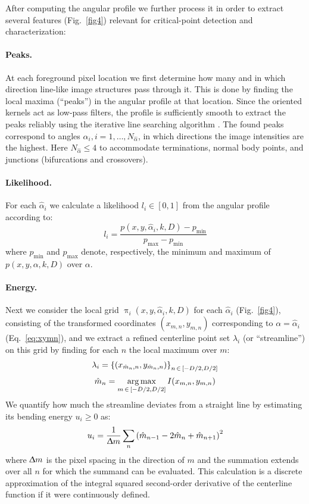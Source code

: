 After computing the angular profile we further process it in order to extract several features (Fig.~\ref{fig4}) relevant for critical-point detection and characterization:

\paragraph{Peaks.} At each foreground pixel location we first determine how many and in which direction line-like image structures pass through it. This is done by finding the local maxima (``peaks'') in the angular profile at that location. Since the oriented kernels act as low-pass filters, the profile is sufficiently smooth to extract the peaks reliably using the iterative line searching algorithm \cite{flannery1992numerical}. The found peaks correspond to angles $\hat{\alpha}_{i}, i=1,\dots,N_{\hat{\alpha}}$, in which directions the image intensities are the highest. Here $N_{\hat{\alpha}}\leq 4$ to accommodate terminations, normal body points, and junctions (bifurcations and crossovers).

\paragraph{Likelihood.} For each $\hat{\alpha}_{i}$ we calculate a likelihood $l_i \in \left[ 0, 1 \right]  $ from the angular profile according to:
\begin{equation} 
l_i = \frac{p(x,y,\hat{\alpha}_{i},k,D)-p_{\min}}{p_{\max}-p_{\min}}
\end{equation}
where $p_{\min}$ and $p_{\max}$ denote, respectively, the minimum and maximum of $p(x,y,\alpha,k,D)$ over $\alpha$.

\paragraph{Energy.} Next we consider the local grid $\uppi_{i}(x,y,\hat{\alpha}_{i},k,D)$ for each $\hat{\alpha}_{i}$ (Fig.~\ref{fig4}), consisting of the transformed coordinates $(x_{m,n},y_{m,n})$ corresponding to $\alpha=\hat{\alpha}_{i}$ (Eq.~\ref{eq:xymn}), and we extract a refined centerline point set $\lambda_{i}$ (or ``streamline'') on this grid by finding for each $n$ the local maximum over $m$:
\begin{gather}
\label{eq:refine-centerline} 
\lambda_{i} = \left\{(x_{\hat{m}_{n},n},y_{\hat{m}_{n},n})\right\}_{n\,\in\,\left[-D/2,D/2\right]}\\[0.5ex]
\hat{m}_{n} = \operatorname*{arg\,max}_{m\,\in\,\left[-D/2,D/2\right]} I(x_{m,n},y_{m,n})
\label{eq:hatm}
\end{gather}
We quantify how much the streamline deviates from a straight line by estimating its bending energy $u_{i}\geq0$ as:
\begin{equation}
u_{i} = \frac{1}{\Updelta m}\sum_{n} \left( \hat{m}_{n-1} - 2\hat{m}_{n} + \hat{m}_{n+1} \right)^2
\end{equation}
where $\Updelta m$ is the pixel spacing in the direction of $m$ and the summation extends over all $n$ for which the summand can be evaluated. This calculation is a discrete approximation of the integral squared second-order derivative of the centerline function if it were continuously defined.

